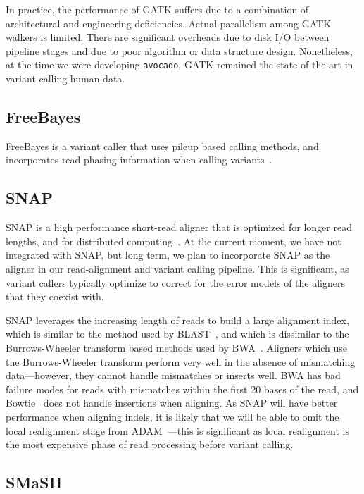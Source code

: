 \documentclass{acm_proc_article-sp}
\begin{document}
In practice, the performance of GATK suffers due to a combination of architectural
and engineering deficiencies.
Actual parallelism among GATK walkers is limited.
There are significant overheads due to disk I/O between pipeline stages and due
to poor algorithm or data structure design.
Nonetheless, at the time we were developing \texttt{avocado}, GATK remained the
state of the art in variant calling human data.

\subsection{FreeBayes}
\label{sec:freebayes}

FreeBayes is a variant caller that uses pileup based calling methods, and incorporates read phasing information when calling
variants~\cite{garrison12}.

\subsection{SNAP}
\label{sec:snap}


SNAP is a high performance short-read aligner that is optimized for longer read lengths, and for distributed computing~\cite{zaharia11}.
At the current moment, we have not integrated with SNAP, but long term, we plan to incorporate SNAP as the aligner in our read-alignment
and variant calling pipeline. This is significant, as variant callers typically optimize to correct for the error models of the aligners that they
coexist with.

SNAP leverages the increasing length of reads to build a large alignment index, which is similar to the method used by
BLAST~\cite{altschul90}, and which is dissimilar to the Burrows-Wheeler transform based methods used by BWA~\cite{li09bwa}. Aligners
which use the Burrows-Wheeler transform perform very well in the absence of mismatching data---however, they cannot handle mismatches
or inserts well. BWA has bad failure modes for reads with mismatches within the first 20 bases of the read, and Bowtie~\cite{langmead09}
does not handle insertions when aligning. As SNAP will have better performance when aligning indels, it is likely that we will be able to
omit the local realignment stage from ADAM~\cite{massie13}---this is significant as local realignment is the most expensive phase of
read processing before variant calling.

\subsection{SMaSH}
\label{sec:smash}
\end{document}
